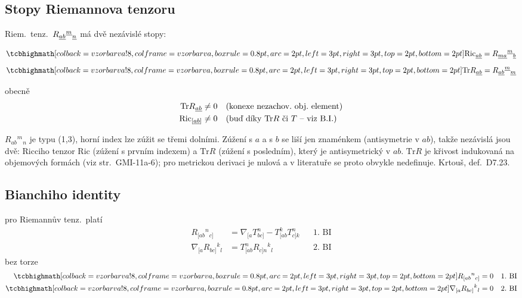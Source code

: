 \subsection*{Stopy Riemannova tenzoru}
Riem.\ tenz.\ $R_{\underline{ab}}{}^{\underline{m}}{}_{\underline{n}}$ má dvě nezávislé stopy:

\begin{definice}
\[
  \vzorec{\mathrm{Ric}_{\gmIjedenactAu{ab}} = R_{\gmIjedenactAu{ma}}{}^{\gmIjedenactAu{m}}{}_{\gmIjedenactAu{b}}}
\]
\[
  \vzorec{\mathrm{Tr}R_{\gmIjedenactAu{ab}} = R_{\gmIjedenactAu{ab}}{}^{\gmIjedenactAu{m}}{}_{\gmIjedenactAu{m}}}
\]
\end{definice}

obecně
\begin{align*}
  \mathrm{Tr}R_{\underline{ab}} &\neq 0 && \text{(konexe nezachov.\ obj.\ element)} \\
  \mathrm{Ric}_{[\underline{ab}]} &\neq 0 && \text{(buď díky $\mathrm{Tr}R$ či $T$ -- viz B.I.)}
\end{align*}

\begin{vysvetleni}
$R_{ab}{}^{m}{}_{n}$ je typu (1,3), horní index lze zúžit se třemi dolními. Zúžení s $a$ a s $b$ se liší jen znaménkem (antisymetrie v $ab$), takže nezávislá jsou dvě: Ricciho tenzor $\mathrm{Ric}$ (zúžení s prvním indexem) a $\mathrm{Tr}R$ (zúžení s posledním), který je antisymetrický v $ab$. $\mathrm{Tr}R$ je křivost indukovaná na objemových formách (viz str.~GMI-11a-6); pro metrickou derivaci je nulová a v literatuře se proto obvykle nedefinuje. Krtouš, def.\ D7.23.
\end{vysvetleni}

\subsection*{Bianchiho identity}
\begin{veta}
pro Riemannův tenz.\ platí
\begin{align*}
  R_{[ab}{}^{n}{}_{c]} &= \nabla_{[a}T^{n}_{bc]} - T^{k}_{[ab}T^{n}_{c]k} && \text{1.\ BI} \\
  \nabla_{[a}R_{bc]}{}^{k}{}_{l} &= T^{n}_{[ab}R_{c]n}{}^{k}{}_{l} && \text{2.\ BI}
\end{align*}
bez torze
\begin{align*}
  \vzorec{R_{[ab}{}^{n}{}_{c]} = 0} &&& \text{1.\ BI} \\
  \vzorec{\nabla_{[a}R_{bc]}{}^{k}{}_{l} = 0} &&& \text{2.\ BI}
\end{align*}
\end{veta}

